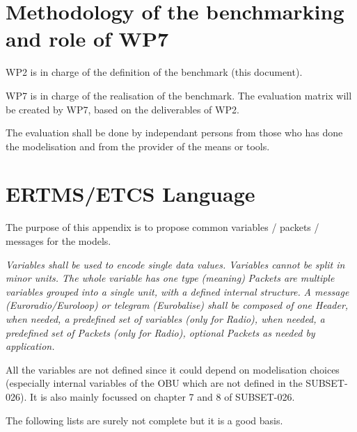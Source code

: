 \documentclass{template/openetcs_report}
\begin{document}
\chapter{Methodology of the benchmarking and role of WP7}

WP2 is in charge of the definition of the benchmark (this document).

WP7 is in charge of the realisation of the benchmark. The evaluation matrix will be created by WP7, based on the deliverables of WP2. 

The evaluation shall be done by independant persons from those who has done the modelisation and from the provider of the means or tools.

\nocite{*}




\appendix

\chapter{ERTMS/ETCS Language}

The purpose of this appendix is to propose common variables / packets / messages for the models.

\emph{ Variables shall be used to encode single data values. Variables cannot be split in minor units. The whole variable has one type (meaning)}
\newline
\emph{Packets are multiple variables grouped into a single unit, with a defined internal structure.}
\newline
\emph{A message (Euroradio/Euroloop) or telegram (Eurobalise) shall be composed of one Header, when needed, a predefined set of variables (only for Radio), when needed, a predefined set of Packets (only for Radio), optional Packets as needed by application.}

All the variables are not defined since it could depend on modelisation choices (especially internal variables of the OBU which are not defined in the SUBSET-026). It is also mainly focussed on chapter 7 and 8 of SUBSET-026.

The following lists are surely not complete but it is a good basis.
\end{document}
